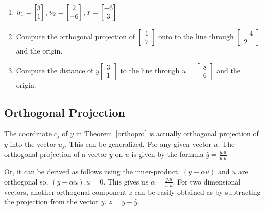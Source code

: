 \documentclass[aima104_lecturenotes_ku.tex]{subfiles}
\begin{document}
\begin{enumerate}
\begin{enumerate}
 \item $u_1 =
  \begin{bmatrix}
    3 \\ 1
  \end{bmatrix} ,  \vspace{5mm}
  u_2 =
  \begin{bmatrix}
    2 \\ -6
  \end{bmatrix},  \vspace{5mm}
  x =
  \begin{bmatrix}
    -6 \\ 3
  \end{bmatrix}
  $

  \item Compute the orthogonal projection of $
    \begin{bmatrix}
      1 \\ 7
    \end{bmatrix}
    $ onto to the line through $
    \begin{bmatrix}
      -4 \\ 2
    \end{bmatrix}
    $ and the origin.

  \item Compute the distance of $ y
    \begin{bmatrix}
      3 \\ 1
    \end{bmatrix}
    $ to the line through
    $u= \begin{bmatrix}
      8 \\ 6
    \end{bmatrix}
    $ and the origin.
    \end{enumerate}
\end{enumerate}
\subsection{Orthogonal Projection}
The coordinate $c_j$ of $y$ in Theorem~\ref{orthopro} is actually orthogonal projection of $y$ into the vector $u_j$. This can be generalized. For any given vector $u$. The orthogonal projection of a vector $y$ on $u$ is given by the formula $\displaystyle \hat{y} = \frac{y.u}{u.u}$

Or, it can be derived as follows using the inner-product. $(y-\alpha u)$ and $u$ are orthogonal so, $(y-\alpha u).u=0$. This gives us $\displaystyle \alpha = \frac{y.u}{u.u}$. For two dimensional vectors, another orthogonal component $z$ can be easily obtained as by subtracting the projection from the vector $y$. $z = y - \hat{y}$.
\end{document}
